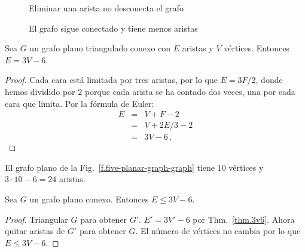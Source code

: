 \begin{figure}[ht]
\begin{minipage}{.45\textwidth}
\begin{center}
\caption{Eliminar una arista no desconecta el grafo}\label{f.five-connected-remains}
\end{center}
\end{minipage}
\hfill
\begin{minipage}{.45\textwidth}
\begin{center}
\caption{El grafo sigue conectado y tiene menos aristas}\label{f.five-connected-fewer}
\end{center}
\end{minipage}
\end{figure}

\begin{theorem}\label{thm.3v6}
Sea $G$ un grafo plano triangulado conexo con $E$ aristas y $V$ vértices. Entonces $E= 3V-6$.
\end{theorem}
\begin{proof}
Cada cara está limitada por tres aristas, por lo que $E=3F/2$, donde hemos dividido por $2$ porque cada arista se ha contado dos veces, una por cada cara que limita. Por la fórmula de Euler:
\begin{eqnarray*}
E&=&V+F-2\\
&=&V+2E/3-2\\
&=&3V-6\,.
\end{eqnarray*}
\end{proof}

\begin{example}
El grafo plano de la Fig.~\ref{f.five-planar-graph-graph} tiene $10$ vértices y $3\cdot 10-6=24$ aristas.
\end{example}

\begin{theorem}\label{thm.count}
Sea $G$ un grafo plano conexo. Entonces $E\leq 3V-6$.
\end{theorem}

\begin{proof}
Triangular $G$ para obtener $G'$. $E'= 3V'-6$ por Thm.~\ref{thm.3v6}. Ahora quitar aristas de $G'$ para obtener $G$. El número de vértices no cambia por lo que $E\leq 3V-6$.
\end{proof}

